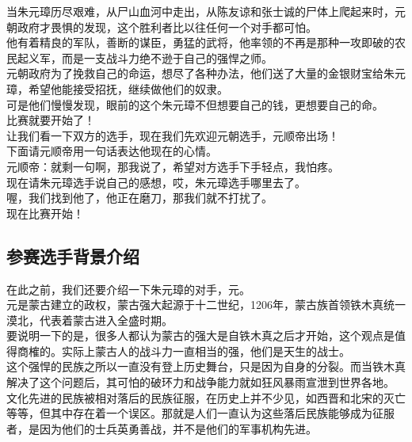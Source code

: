 \begin{multicols}{\theparacolNo}
当朱元璋历尽艰难，从尸山血河中走出，从陈友谅和张士诚的尸体上爬起来时，元朝政府才畏惧的发现，这个胜利者比以往任何一个对手都可怕。\\

他有着精良的军队，善断的谋臣，勇猛的武将，他率领的不再是那种一攻即破的农民起义军，而是一支战斗力绝不逊于自己的强悍之师。\\

元朝政府为了挽救自己的命运，想尽了各种办法，他们送了大量的金银财宝给朱元璋，希望他能接受招抚，继续做他们的奴隶。\\

可是他们慢慢发现，眼前的这个朱元璋不但想要自己的钱，更想要自己的命。\\

比赛就要开始了！\\

让我们看一下双方的选手，现在我们先欢迎元朝选手，元顺帝出场！\\

下面请元顺帝用一句话表达他现在的心情。\\

元顺帝：就剩一句啊，那我说了，希望对方选手下手轻点，我怕疼。\\

现在请朱元璋选手说自己的感想，哎，朱元璋选手哪里去了。\\

喔，我们找到他了，他正在磨刀，那我们就不打扰了。\\

现在比赛开始！\\

\subsection{参赛选手背景介绍}
在此之前，我们还要介绍一下朱元璋的对手，元。\\

元是蒙古建立的政权，蒙古强大起源于十二世纪，1206年，蒙古族首领铁木真统一漠北，代表着蒙古进入全盛时期。\\

要说明一下的是，很多人都认为蒙古的强大是自铁木真之后才开始，这个观点是值得商榷的。实际上蒙古人的战斗力一直相当的强，他们是天生的战士。\\

这个强悍的民族之所以一直没有登上历史舞台，只是因为自身的分裂。而当铁木真解决了这个问题后，其可怕的破环力和战争能力就如狂风暴雨宣泄到世界各地。\\

文化先进的民族被相对落后的民族征服，在历史上并不少见，如西晋和北宋的灭亡等等，但其中存在着一个误区。那就是人们一直认为这些落后民族能够成为征服者，是因为他们的士兵英勇善战，并不是他们的军事机构先进。\\


\end{multicols}
